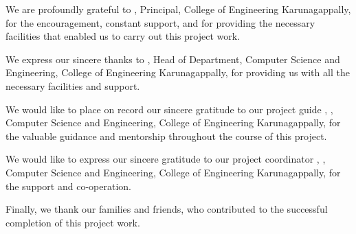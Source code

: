 We are profoundly grateful to \principalname, Principal, College of Engineering Karunagappally, for the encouragement, constant support, and for providing the necessary facilities that enabled us to carry out this project work.

We express our sincere thanks to \hodname, Head of Department, Computer Science and Engineering, College of Engineering Karunagappally, for providing us with all the necessary facilities and support.

We would like to place on record our sincere gratitude to our project guide \guidename, \guidedesig, Computer Science and Engineering, College of Engineering Karunagappally, for the valuable guidance and mentorship throughout the course of this project.

We would like to express our sincere gratitude to our project coordinator \coordname, \coorddesig, Computer Science and Engineering, College of Engineering Karunagappally, for the support and co-operation.

Finally, we thank our families and friends, who contributed to the successful completion of this project work.

\vspace{0.8cm}
\noindent\textbf{\studentA}\\
\textbf{\studentB}\\
\textbf{\studentC}
\clearpage
